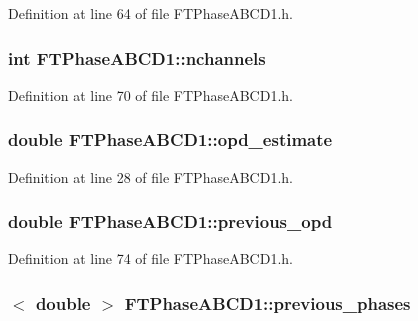 Definition at line 64 of file FTPhaseABCD1.h.

\hypertarget{classFTPhaseABCD1_adc6d698b02a5ac590368df1c94ef1f9c}{
\subsubsection[{nchannels}]{\setlength{\rightskip}{0pt plus 5cm}int {\bf FTPhaseABCD1::nchannels}}}
\label{classFTPhaseABCD1_adc6d698b02a5ac590368df1c94ef1f9c}


Definition at line 70 of file FTPhaseABCD1.h.

\hypertarget{classFTPhaseABCD1_acc233644e0b0bfd0efdf31fda757fcce}{
\subsubsection[{opd\_\-estimate}]{\setlength{\rightskip}{0pt plus 5cm}double {\bf FTPhaseABCD1::opd\_\-estimate}}}
\label{classFTPhaseABCD1_acc233644e0b0bfd0efdf31fda757fcce}


Definition at line 28 of file FTPhaseABCD1.h.

\hypertarget{classFTPhaseABCD1_a4775273ef7115bdb72e25501d0c948f3}{
\subsubsection[{previous\_\-opd}]{\setlength{\rightskip}{0pt plus 5cm}double {\bf FTPhaseABCD1::previous\_\-opd}}}
\label{classFTPhaseABCD1_a4775273ef7115bdb72e25501d0c948f3}


Definition at line 74 of file FTPhaseABCD1.h.

\hypertarget{classFTPhaseABCD1_ac673e4c9a6b8139316509541e1044828}{
\subsubsection[{previous\_\-phases}]{$<$ double $>$ {\bf FTPhaseABCD1::previous\_\-phases}}}
\label{classFTPhaseABCD1_ac673e4c9a6b8139316509541e1044828}


